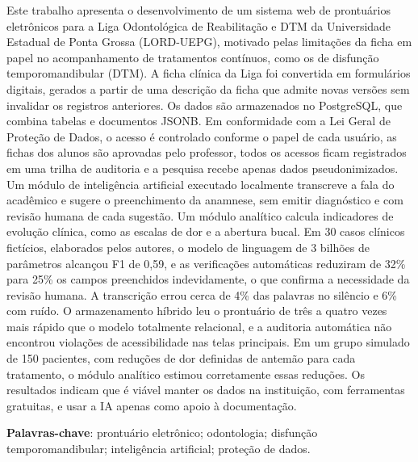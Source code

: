 Este trabalho apresenta o desenvolvimento de um sistema web de prontuários eletrônicos para a Liga Odontológica de Reabilitação e DTM da Universidade Estadual de Ponta Grossa (LORD-UEPG), motivado pelas limitações da ficha em papel no acompanhamento de tratamentos contínuos, como os de disfunção temporomandibular (DTM). A ficha clínica da Liga foi convertida em formulários digitais, gerados a partir de uma descrição da ficha que admite novas versões sem invalidar os registros anteriores. Os dados são armazenados no PostgreSQL, que combina tabelas e documentos JSONB. Em conformidade com a Lei Geral de Proteção de Dados, o acesso é controlado conforme o papel de cada usuário, as fichas dos alunos são aprovadas pelo professor, todos os acessos ficam registrados em uma trilha de auditoria e a pesquisa recebe apenas dados pseudonimizados. Um módulo de inteligência artificial executado localmente transcreve a fala do acadêmico e sugere o preenchimento da anamnese, sem emitir diagnóstico e com revisão humana de cada sugestão. Um módulo analítico calcula indicadores de evolução clínica, como as escalas de dor e a abertura bucal. Em 30 casos clínicos fictícios, elaborados pelos autores, o modelo de linguagem de 3 bilhões de parâmetros alcançou F1 de 0,59, e as verificações automáticas reduziram de 32\% para 25\% os campos preenchidos indevidamente, o que confirma a necessidade da revisão humana. A transcrição errou cerca de 4\% das palavras no silêncio e 6\% com ruído. O armazenamento híbrido leu o prontuário de três a quatro vezes mais rápido que o modelo totalmente relacional, e a auditoria automática não encontrou violações de acessibilidade nas telas principais. Em um grupo simulado de 150 pacientes, com reduções de dor definidas de antemão para cada tratamento, o módulo analítico estimou corretamente essas reduções. Os resultados indicam que é viável manter os dados na instituição, com ferramentas gratuitas, e usar a IA apenas como apoio à documentação.

\textbf{Palavras-chave}: prontuário eletrônico; odontologia; disfunção temporomandibular; inteligência artificial; proteção de dados.
